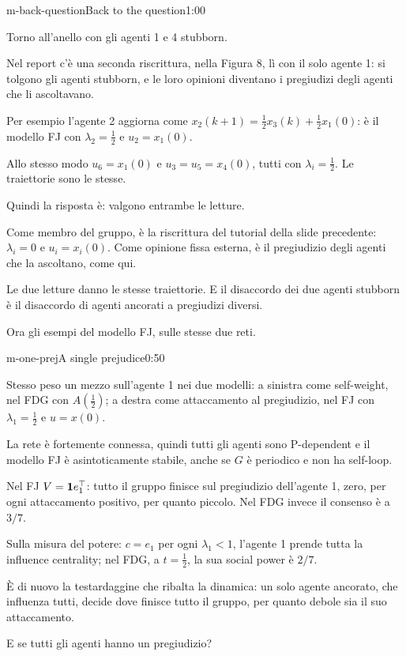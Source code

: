 \begin{slide}{m-back-question}{Back to the question}{1:00}
  \begin{discorso}
    \item Torno all'anello con gli agenti 1 e 4 stubborn.
    \item Nel report c'è una seconda riscrittura, nella Figura 8, lì con il solo agente 1: si tolgono gli agenti stubborn, e le loro opinioni diventano i pregiudizi degli agenti che li ascoltavano.
    \item Per esempio l'agente 2 aggiorna come $x_2(k+1)=\tfrac12x_3(k)+\tfrac12x_1(0)$: è il modello FJ con $\lambda_2=\tfrac12$ e $u_2=x_1(0)$.
    \item Allo stesso modo $u_6=x_1(0)$ e $u_3=u_5=x_4(0)$, tutti con $\lambda_i=\tfrac12$. Le traiettorie sono le stesse.
    \item Quindi la risposta è: valgono entrambe le letture.
    \item Come membro del gruppo, è la riscrittura del tutorial della slide precedente: $\lambda_i=0$ e $u_i=x_i(0)$. Come opinione fissa esterna, è il pregiudizio degli agenti che la ascoltano, come qui.
    \item Le due letture danno le stesse traiettorie. E il disaccordo dei due agenti stubborn è il disaccordo di agenti ancorati a pregiudizi diversi.
    \item Ora gli esempi del modello FJ, sulle stesse due reti.
  \end{discorso}
\end{slide}


\begin{slide}{m-one-prej}{A single prejudice}{0:50}
  \begin{discorso}
    \item Stesso peso un mezzo sull'agente 1 nei due modelli: a sinistra come self-weight, nel FDG con $A(\tfrac12)$; a destra come attaccamento al pregiudizio, nel FJ con $\lambda_1=\tfrac12$ e $u=x(0)$.
    \item La rete è fortemente connessa, quindi tutti gli agenti sono P-dependent e il modello FJ è asintoticamente stabile, anche se $G$ è periodico e non ha self-loop.
    \item Nel FJ $V=\mathbf{1} e_1^\top$: tutto il gruppo finisce sul pregiudizio dell'agente 1, zero, per ogni attaccamento positivo, per quanto piccolo. Nel FDG invece il consenso è a $3/7$.
    \item Sulla misura del potere: $c=e_1$ per ogni $\lambda_1<1$, l'agente 1 prende tutta la influence centrality; nel FDG, a $t=\tfrac12$, la sua social power è $2/7$.
    \item È di nuovo la testardaggine che ribalta la dinamica: un solo agente ancorato, che influenza tutti, decide dove finisce tutto il gruppo, per quanto debole sia il suo attaccamento.
    \item E se tutti gli agenti hanno un pregiudizio?
  \end{discorso}
\end{slide}

